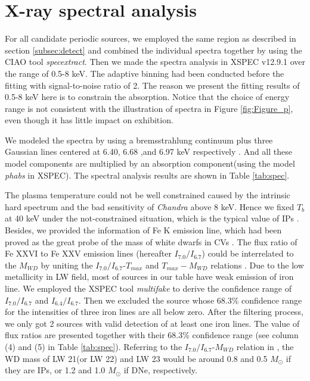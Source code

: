 \documentclass[twoside,twocolumn]{aastex63}
\begin{document}
\section{X-ray spectral analysis}\label{sec:spectra}
For all candidate periodic sources, we employed the same region as described in section \ref{subsec:detect} and combined the individual spectra together by using the CIAO tool \emph {specextract}. Then we made the spectra analysis in XSPEC v12.9.1 over the range of 0.5-8 keV. The adaptive binning had been conducted before the fitting with signal-to-noise ratio of 2. The reason we present the fitting results of 0.5-8 keV here is to constrain the absorption. Notice that the choice of energy range is not consistent with the illustration of spectra in Figure \ref{fig:Figure_p}, even though it has little impact on exhibition. 

We modeled the spectra by using a bremsstrahlung continuum plus three Gaussian lines centered at 6.40, 6.68 ,and 6.97 keV respectively  \citep{2018ApJS..235...26Z,2019ApJ...882..164X}. And all these model components are multiplied by an absorption component(using the model \emph {phabs} in XSPEC). The spectral analysis results are shown in Table \ref{tab:spec}.

The plasma temperature could not be well constrained caused by the intrinsic hard spectrum and the bad sensitivity of \emph{Chandra} above 8 keV. Hence we fixed $T_b$ at 40 keV under the not-constrained situation, which is the typical value of IPs \citep{2016ApJ...826..160H}.
Besides, we provided the information of Fe K emission line, which had been proved as the great probe of the mass of white dwarfs in CVs \citep{2016ApJ...818..136X}. The flux ratio of Fe XXVI to Fe XXV emission lines (hereafter $I_{7.0}/I_{6.7}$) could be interrelated to the $M_{WD}$ by uniting the $I_{7.0}/I_{6.7}$-$T_{max}$ and $T_{max}-M_{WD}$ relations \citep{2019ApJ...882..164X}. Due to the low metallicity in LW field, most of sources in our table have weak emission of iron line. We employed the XSPEC tool \emph{multifake} to derive the confidence range of $I_{7.0}/I_{6.7}$ and $I_{6.4}/I_{6.7}$. Then we excluded the source whose 68.3\% confidence range for the intensities of three iron lines are all below zero. After the filtering process, we only got 2 sources with valid detection of at least one iron lines. The value of flux ratios are presented together with their 68.3\% confidence range (see column (4) and (5) in Table \ref{tab:spec}). Referring to the $I_{7.0}/I_{6.7}$-$M_{WD}$ relation in \citet{2019ApJ...882..164X}, the WD mass of LW 21(or LW 22) and LW 23 would be around 0.8 and 0.5 $M_\odot$ if they are IPs, or 1.2 and 1.0 $M_\odot$ if DNe, respectively.
\end{document}
